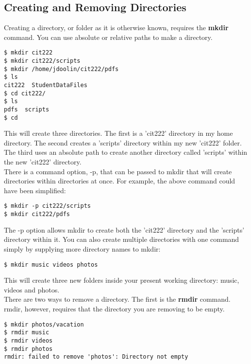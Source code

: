 \subsection{Creating and Removing Directories}

Creating a directory, or folder as it is otherwise known, requires the \textbf{mkdir} command.  You can use absolute or relative paths to make a directory.

\begin{verbatim}
$ mkdir cit222
$ mkdir cit222/scripts
$ mkdir /home/jdoolin/cit222/pdfs
$ ls
cit222  StudentDataFiles
$ cd cit222/
$ ls
pdfs  scripts
$ cd
\end{verbatim}

This will create three directories.  The first is a 'cit222' directory in my home directory.  The second creates a 'scripts' directory within my new 'cit222' folder.  The third uses an absolute path to create another directory called 'scripts' within the new 'cit222' directory.\\

There is a command option, -p,  that can be passed to mkdir that will create directories within directories at once.  For example, the above command could have been simplified:

\begin{verbatim}
$ mkdir -p cit222/scripts
$ mkdir cit222/pdfs
\end{verbatim}

The -p option allows mkdir to create both the 'cit222' directory and the 'scripts' directory within it.  You can also create multiple directories with one command simply by supplying more directory names to mkdir:

\begin{verbatim}
$ mkdir music videos photos
\end{verbatim}

This will create three new folders inside your present working directory: music, videos and photos.\\

There are two ways to remove a directory.  The first is the \textbf{rmdir} command.  rmdir, however, requires that the directory you are removing to be empty.

\begin{verbatim}
$ mkdir photos/vacation
$ rmdir music
$ rmdir videos
$ rmdir photos
rmdir: failed to remove 'photos': Directory not empty
\end{verbatim}

